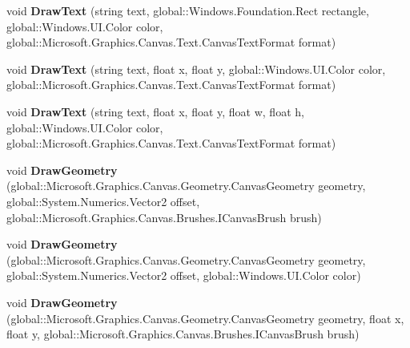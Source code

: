 \begin{DoxyCompactItemize}
void {\bfseries Draw\+Text} (string text, global\+::\+Windows.\+Foundation.\+Rect rectangle, global\+::\+Windows.\+U\+I.\+Color color, global\+::\+Microsoft.\+Graphics.\+Canvas.\+Text.\+Canvas\+Text\+Format format)
\item 
\mbox{\label{interface_microsoft_1_1_graphics_1_1_canvas_1_1_i_canvas_drawing_session_a97dfcfa11709602933556b5293ce5962}} 
void {\bfseries Draw\+Text} (string text, float x, float y, global\+::\+Windows.\+U\+I.\+Color color, global\+::\+Microsoft.\+Graphics.\+Canvas.\+Text.\+Canvas\+Text\+Format format)
\item 
\mbox{\label{interface_microsoft_1_1_graphics_1_1_canvas_1_1_i_canvas_drawing_session_af8be4ca90224b429475f9ada3770439f}} 
void {\bfseries Draw\+Text} (string text, float x, float y, float w, float h, global\+::\+Windows.\+U\+I.\+Color color, global\+::\+Microsoft.\+Graphics.\+Canvas.\+Text.\+Canvas\+Text\+Format format)
\item 
\mbox{\label{interface_microsoft_1_1_graphics_1_1_canvas_1_1_i_canvas_drawing_session_a9ca094c79f047b0753dc51a8286ac2ff}} 
void {\bfseries Draw\+Geometry} (global\+::\+Microsoft.\+Graphics.\+Canvas.\+Geometry.\+Canvas\+Geometry geometry, global\+::\+System.\+Numerics.\+Vector2 offset, global\+::\+Microsoft.\+Graphics.\+Canvas.\+Brushes.\+I\+Canvas\+Brush brush)
\item 
\mbox{\label{interface_microsoft_1_1_graphics_1_1_canvas_1_1_i_canvas_drawing_session_a014640571c93e977880498bdebb9e3f2}} 
void {\bfseries Draw\+Geometry} (global\+::\+Microsoft.\+Graphics.\+Canvas.\+Geometry.\+Canvas\+Geometry geometry, global\+::\+System.\+Numerics.\+Vector2 offset, global\+::\+Windows.\+U\+I.\+Color color)
\item 
\mbox{\label{interface_microsoft_1_1_graphics_1_1_canvas_1_1_i_canvas_drawing_session_a78e71292f3d52ea65e86119c480af3b1}} 
void {\bfseries Draw\+Geometry} (global\+::\+Microsoft.\+Graphics.\+Canvas.\+Geometry.\+Canvas\+Geometry geometry, float x, float y, global\+::\+Microsoft.\+Graphics.\+Canvas.\+Brushes.\+I\+Canvas\+Brush brush)

\end{DoxyCompactItemize}
